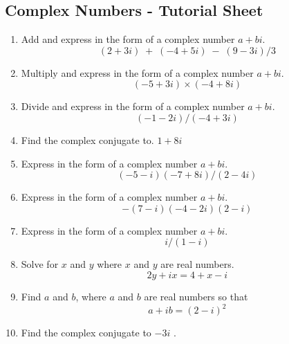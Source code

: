 \documentclass[a4paper,12pt]{article}
\begin{document}
\subsection*{Complex Numbers - Tutorial Sheet}
\begin{enumerate}
\item 
 Add and express in the form of a complex number $a + b i$. 
\[ (2 + 3i) \;+\; (-4 + 5i) \;-\; (9 - 3i) / 3 \]
\item 
Multiply and express in the form of a complex number $a + b i$. 
 \[(-5 + 3i)\times (- 4 + 8i) \]
\item 
Divide and express in the form of a complex number $a + b i$. 
\[ (-1 - 2i) / (- 4 + 3i) \]
\item
Find the complex conjugate to. 
 $1 + 8 i $
\item
Express in the form of a complex number $a + b i$. 
 \[(-5 - i)(- 7 + 8i) / (2 - 4i) \]
\item
Express in the form of a complex number $a + b i$. 
\[ - (7 - i)(- 4 - 2i)(2 - i) \]
\item
Express in the form of a complex number $a + b i$. 
\[ i / (1 - i) \]
\item
Solve for $x$ and $y$ where $x$ and $y$ are real numbers. 
\[ 2 y + i x = 4 + x - i \]
\item
Find $a$ and $b$, where $a$ and $b$ are real numbers so that 
\[ a + i b = (2 - i)^2\]
\item
Find the complex conjugate to $- 3 i$ .
\end{enumerate}
\end{document}
